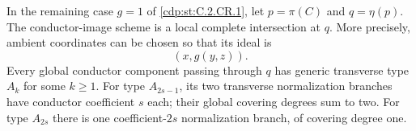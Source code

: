 
\begin{proposition}\label{cdp:st:C.2.CR.6}
In the remaining case $g=1$ of \ref{cdp:st:C.2.CR.1}, let
$p=\pi(C)$ and $q=\eta(p)$. The conductor-image
scheme is a local complete intersection at $q$.
More precisely, ambient coordinates can be chosen
so that its ideal is
\[
                         (x,g(y,z)).               \tag{C.CR.21}\label{cdp:eq:C.CR.21}
\]
Every global conductor component passing through
$q$ has generic transverse type $A_k$ for some
$k\ge1$. For type $A_{2s-1}$, its two transverse
normalization branches have conductor coefficient
$s$ each; their global covering degrees sum to two.
For type $A_{2s}$ there is one coefficient-$2s$
normalization branch, of covering degree one.
\end{proposition}
